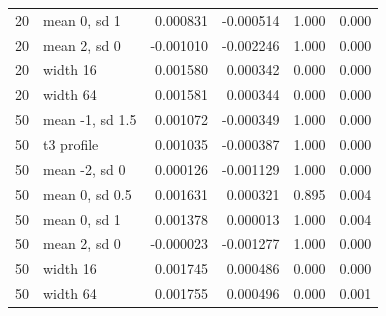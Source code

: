 {\begin{longtable}{rlrrrr}
20 & mean 0, sd 1 & 0.000831 & -0.000514 & 1.000 & 0.000 \\
20 & mean 2, sd 0 & -0.001010 & -0.002246 & 1.000 & 0.000 \\
20 & width 16 & 0.001580 & 0.000342 & 0.000 & 0.000 \\
20 & width 64 & 0.001581 & 0.000344 & 0.000 & 0.000 \\
50 & mean -1, sd 1.5 & 0.001072 & -0.000349 & 1.000 & 0.000 \\
50 & t3 profile & 0.001035 & -0.000387 & 1.000 & 0.000 \\
50 & mean -2, sd 0 & 0.000126 & -0.001129 & 1.000 & 0.000 \\
50 & mean 0, sd 0.5 & 0.001631 & 0.000321 & 0.895 & 0.004 \\
50 & mean 0, sd 1 & 0.001378 & 0.000013 & 1.000 & 0.004 \\
50 & mean 2, sd 0 & -0.000023 & -0.001277 & 1.000 & 0.000 \\
50 & width 16 & 0.001745 & 0.000486 & 0.000 & 0.000 \\
50 & width 64 & 0.001755 & 0.000496 & 0.000 & 0.001 \\
\bottomrule\end{longtable}}
